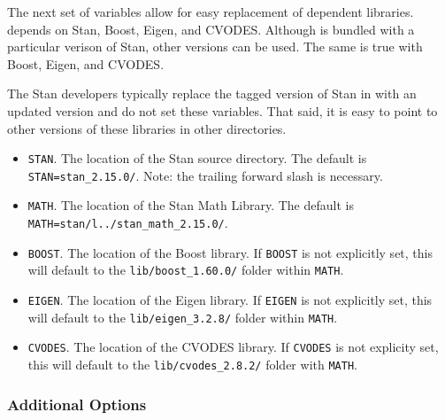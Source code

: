 The next set of variables allow for easy replacement of dependent
libraries. \CmdStan depends on Stan, Boost, Eigen, and
CVODES. Although \CmdStan is bundled with a particular verison of
Stan, other versions can be used. The same is true with Boost, Eigen,
and CVODES.

The Stan developers typically replace the tagged version of Stan in
 with an updated version and do not set
these variables. That said, it is easy to point \CmdStan to other
versions of these libraries in other directories.
%
\begin{itemize}
  \item \Verb|STAN|. The location of the Stan source
    directory. The default is \Verb|STAN=stan_2.15.0/|. Note: the
    trailing forward slash is necessary.
  \item \Verb|MATH|. The location of the Stan Math Library. The
    default is \Verb|MATH=stan/l../stan_math_2.15.0/|.
  \item \Verb|BOOST|. The location of the Boost library. If
    \Verb|BOOST| is not explicitly set, this will default to the
    \Verb|lib/boost_1.60.0/| folder within \Verb|MATH|.
  \item \Verb|EIGEN|. The location of the Eigen library. If
    \Verb|EIGEN| is not explicitly set, this will default to the
    \Verb|lib/eigen_3.2.8/| folder within \Verb|MATH|.
  \item \Verb|CVODES|. The location of the CVODES library. If
    \Verb|CVODES| is not explicity set, this will default to the
    \Verb|lib/cvodes_2.8.2/| folder with \Verb|MATH|.
\end{itemize}
%

\subsubsection{Additional Options}


